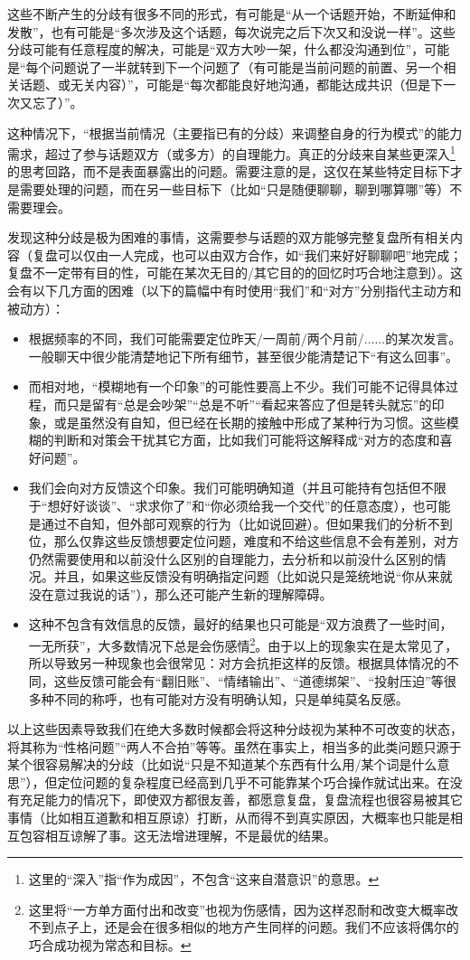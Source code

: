 \begin{explain}
这些不断产生的分歧有很多不同的形式，有可能是“从一个话题开始，不断延伸和发散”，也有可能是“多次涉及这个话题，每次说完之后下次又和没说一样”。这些分歧可能有任意程度的解决，可能是“双方大吵一架，什么都没沟通到位”，可能是“每个问题说了一半就转到下一个问题了（有可能是当前问题的前置、另一个相关话题、或无关内容）”，可能是“每次都能良好地沟通，都能达成共识（但是下一次又忘了）”。

这种情况下，“根据当前情况（主要指已有的分歧）来调整自身的行为模式”的能力需求，超过了参与话题双方（或多方）的自理能力。真正的分歧来自某些更深入\footnote{这里的“深入”指“作为成因”，不包含“这来自潜意识”的意思。}的思考回路，而不是表面暴露出的问题。需要注意的是，这仅在某些特定目标下才是需要处理的问题，而在另一些目标下（比如“只是随便聊聊，聊到哪算哪”等）不需要理会。

发现这种分歧是极为困难的事情，这需要参与话题的双方能够完整复盘所有相关内容（复盘可以仅由一人完成，也可以由双方合作，如“我们来好好聊聊吧”地完成；复盘不一定带有目的性，可能在某次无目的/其它目的的回忆时巧合地注意到）。这会有以下几方面的困难（以下的篇幅中有时使用“我们”和“对方”分别指代主动方和被动方）：
\begin{itemize}
\item 根据频率的不同，我们可能需要定位昨天/一周前/两个月前/......的某次发言。一般聊天中很少能清楚地记下所有细节，甚至很少能清楚记下“有这么回事”。
\item 而相对地，“模糊地有一个印象”的可能性要高上不少。我们可能不记得具体过程，而只是留有“总是会吵架”“总是不听”“看起来答应了但是转头就忘”的印象，或是虽然没有自知，但已经在长期的接触中形成了某种行为习惯。这些模糊的判断和对策会干扰其它方面，比如我们可能将这解释成“对方的态度和喜好问题”。
\item 我们会向对方反馈这个印象。我们可能明确知道（并且可能持有包括但不限于“想好好谈谈”、“求求你了”和“你必须给我一个交代”的任意态度），也可能是通过不自知，但外部可观察的行为（比如说回避）。但如果我们的分析不到位，那么仅靠这些反馈想要定位问题，难度和不给这些信息不会有差别，对方仍然需要使用和以前没什么区别的自理能力，去分析和以前没什么区别的情况。并且，如果这些反馈没有明确指定问题（比如说只是笼统地说“你从来就没在意过我说的话”），那么还可能产生新的理解障碍。
\item 这种不包含有效信息的反馈，最好的结果也只可能是“双方浪费了一些时间，一无所获”，大多数情况下总是会伤感情\footnote{这里将“一方单方面付出和改变”也视为伤感情，因为这样忍耐和改变大概率改不到点子上，还是会在很多相似的地方产生同样的问题。我们不应该将偶尔的巧合成功视为常态和目标。}。由于以上的现象实在是太常见了，所以导致另一种现象也会很常见：对方会抗拒这样的反馈。根据具体情况的不同，这些反馈可能会有“翻旧账”、“情绪输出”、“道德绑架”、“投射压迫”等很多种不同的称呼，也有可能对方没有明确认知，只是单纯莫名反感。
\end{itemize}
以上这些因素导致我们在绝大多数时候都会将这种分歧视为某种不可改变的状态，将其称为“性格问题”“两人不合拍”等等。虽然在事实上，相当多的此类问题只源于某个很容易解决的分歧（比如说“只是不知道某个东西有什么用/某个词是什么意思”），但定位问题的复杂程度已经高到几乎不可能靠某个巧合操作就试出来。在没有充足能力的情况下，即使双方都很友善，都愿意复盘，复盘流程也很容易被其它事情（比如相互道歉和相互原谅）打断，从而得不到真实原因，大概率也只能是相互包容相互谅解了事。这无法增进理解，不是最优的结果。


\end{explain}
